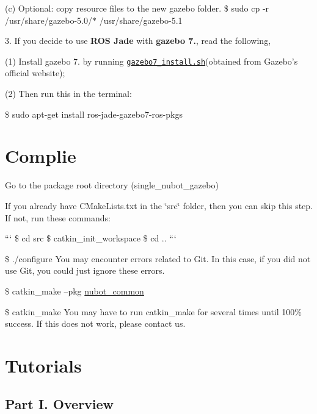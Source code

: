 \begin{DoxyItemize}
\begin{DoxyItemize}
\item (c) Optional\-: copy resource files to the new gazebo folder. {\ttfamily \$ sudo cp -\/r /usr/share/gazebo-\/5.0/$\ast$ /usr/share/gazebo-\/5.1}
\end{DoxyItemize}
\item 3. If you decide to use {\bfseries R\-O\-S Jade} with {\bfseries gazebo 7.}, read the following,
\begin{DoxyItemize}
\item (1) Install gazebo 7. by running \href{https://github.com/nubot-nudt/simatch/blob/master/gazebo7_install.sh}{\tt gazebo7\-\_\-install.\-sh}(obtained from Gazebo's official website);
\item (2) Then run this in the terminal\-:
\item {\ttfamily \$ sudo apt-\/get install ros-\/jade-\/gazebo7-\/ros-\/pkgs}
\end{DoxyItemize}
\end{DoxyItemize}

\section*{Complie}


\begin{DoxyEnumerate}
\item Go to the package root directory (single\-\_\-nubot\-\_\-gazebo)
\item If you already have C\-Make\-Lists.\-txt in the \char`\"{}src\char`\"{} folder, then you can skip this step. If not, run these commands\-:

``` \$ cd src \$ catkin\-\_\-init\-\_\-workspace \$ cd .. ```
\item \$ ./configure You may encounter errors related to Git. In this case, if you did not use Git, you could just ignore these errors.
\item \$ catkin\-\_\-make --pkg \hyperlink{namespacenubot__common}{nubot\-\_\-common}
\item \$ catkin\-\_\-make You may have to run catkin\-\_\-make for several times until 100\% success. If this does not work, please contact us.
\end{DoxyEnumerate}

\section*{Tutorials}

\subsection*{Part I. Overview}

